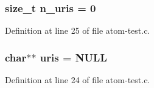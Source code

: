 \subsubsection[{\texorpdfstring{n\+\_\+uris}{n_uris}}]{\setlength{\rightskip}{0pt plus 5cm}size\+\_\+t n\+\_\+uris = 0}\hypertarget{atom-test_8c_a6cac288d3639dbff5f61ce54e5af51ff}{}\label{atom-test_8c_a6cac288d3639dbff5f61ce54e5af51ff}


Definition at line 25 of file atom-\/test.\+c.

\subsubsection[{\texorpdfstring{uris}{uris}}]{\setlength{\rightskip}{0pt plus 5cm}char$\ast$$\ast$ uris = {\bf N\+U\+LL}}\hypertarget{atom-test_8c_a42e30b2eba499e78c1647c915bdbb775}{}\label{atom-test_8c_a42e30b2eba499e78c1647c915bdbb775}


Definition at line 24 of file atom-\/test.\+c.

